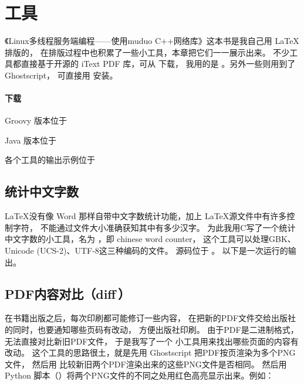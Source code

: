 \chapter{工具}
《Linux多线程服务端编程——使用muduo C++网络库》这本书是我自己用 \LaTeX 排版的，
在排版过程中也积累了一些小工具，本章把它们一一展示出来。
不少工具都直接基于开源的 iText PDF 库，可从  下载，
我用的是 。另外一些则用到了 Ghostscript，
可直接用  安装。

\subsubsection{下载}

Groovy 版本位于 

Java 版本位于 

各个工具的输出示例位于 

\section{统计中文字数}
\LaTeX 没有像 Word 那样自带中文字数统计功能，加上 \LaTeX 源文件中有许多控制字符，
不能通过文件大小准确获知其中有多少汉字。
为此我用C写了一个统计中文字数的小工具，名为 ，即 chinese word counter，
这个工具可以处理GBK、Unicode (UCS-2)、UTF-8这三种编码的文件。
源码位于 。
以下是一次运行的输出。

\section{PDF内容对比（dif\/f\,）}
在书籍出版之后，每次印刷都可能修订一些内容，
在把新的PDF文件交给出版社的同时，也要通知哪些页码有改动，
方便出版社印刷。
由于PDF是二进制格式，无法直接对比新旧PDF文件，
于是我写了一个  小工具用来找出哪些页面的内容有改动。
这个工具的思路很土，就是先用 Ghostscript 把PDF按页渲染为多个PNG文件，
然后用  比较新旧两个PDF渲染出来的这些PNG文件是否相同。
然后用 Python 脚本（）将两个PNG文件的不同之处用红色高亮显示出来。例如：


